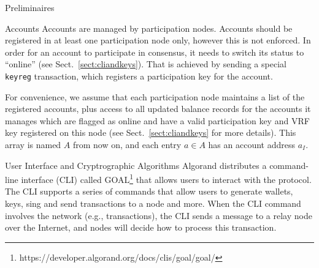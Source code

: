 \documentclass[10pt,a4paper]{article}
\begin{document}
\begin{section}{Preliminaires}
\begin{subsection}{Accounts}
Accounts are managed by participation nodes. Accounts should be registered in at least one participation
node only, however this is not enforced.
In order for an account to participate in consensus, it needs to switch its status to ``online''
(see Sect.~\ref{sect:cliandkeys}). 
That is achieved by sending a special {\tt keyreg} transaction,
which registers a participation key for the account.%

For convenience, we assume that each participation node maintains a list 
of the registered accounts, plus access to all updated balance records for 
the accounts it manages which are flagged as online and have a valid 
participation key and VRF key registered on this node (see Sect.~\ref{sect:cliandkeys}
for more details).
This array is named $A$ from now on, and each entry $a\in A$ has an account address 
$a_I$. %

\end{subsection}
\begin{subsection}{User Interface and Cryptrographic Algorithms}\label{sect:cliandkeys}
    Algorand distributes a command-line interface (CLI) called GOAL\footnote{https://developer.algorand.org/docs/clis/goal/goal/} 
    that allows users to interact with the protocol. The CLI supports a series of commands 
    that allow users to generate  wallets, keys, sing and send transactions to 
    a node and more.
    When the CLI command involves the network (e.g., transactions), the CLI
    sends a message to a relay node over the Internet, and nodes will decide
    how to process this transaction.


\end{subsection}
\end{section}
\end{document}
